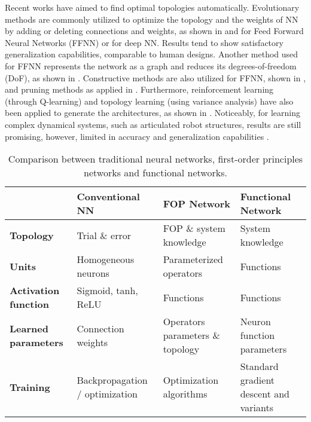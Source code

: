 
Recent works have aimed to find optimal topologies automatically. Evolutionary methods are commonly utilized to optimize the topology and the weights of NN by adding or deleting connections and weights, as shown in \cite{Rocha2005Simultaneousevolutionneural} and \cite{Matteucci2006ELeaRNTEvolutionarylearning} for Feed Forward Neural Networks (FFNN) or \cite{Miikkulainen2017EvolvingDeepNeural} for deep NN. Results tend to show satisfactory generalization capabilities, comparable to human designs. Another method used for FFNN represents the network as a graph and reduces its degrees-of-freedom (DoF), as shown in \cite{He2015Topologicaloptimisationartificial}. Constructive methods are also utilized for FFNN, shown in \cite{Kwok1995Constructivefeedforwardneural}, and pruning methods as applied in \cite{Srinivas2016LearningNeuralNetwork}. Furthermore, reinforcement learning (through Q-learning) and topology learning (using variance analysis) have also been applied to generate the architectures, as shown in \cite{Baker2017Designingneuralnetwork}\cite{Castillo2007Functionalnetworktopology}. Noticeably, for learning complex dynamical systems, such as articulated robot structures, results are still promising, however, limited in accuracy and generalization capabilities \cite{NguyenTuong2011Modellearningrobot}\cite{NguyenTuong2008Learninginversedynamics}\cite{NguyenTuong2010Usingmodelknowledge}. 

\begin{table*}[t]
	\begin{center}
		\begin{tabular}{ |l|l|l|l| } 
			\hline
			&  \textbf{Conventional NN} &  \textbf{FOP Network} & \textbf{Functional Network}\\ 
			\hline
			\textbf{Topology} & Trial \& error & FOP \& system knowledge & System knowledge \\ 
			\hline
			\textbf{Units} & Homogeneous neurons & Parameterized operators & Functions \\ 
			\hline
			\textbf{Activation function} & Sigmoid, tanh, ReLU & Functions & Functions \\   
			\hline
			\textbf{Learned parameters} & Connection weights & Operators parameters \& topology & Neuron function parameters \\
			\hline
			\textbf{Training} & Backpropagation / optimization & Optimization algorithms  & Standard gradient descent and variants\\
			\hline
		\end{tabular}
	\end{center}
	\caption{Comparison between traditional neural networks, first-order principles networks and functional networks.}
	\label{tab:comparison}
\end{table*}


